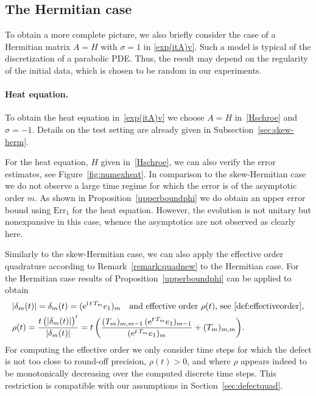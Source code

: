 \documentclass[smallextended]{svjour3pre}%
\numberwithin{equation}{section}
\numberwithin{figure}{section}
\numberwithin{table}{section}
\newcommand{\ttol}{{\rm tol}}
\newcommand\tjnew[1]{{#1}}
\newcommand{\ee}{{\rm e}}
\newcommand{\ii}{{\rm i}}
\newcommand\Erone{\mathrm{Err}_1}
\newcommand\sca{\sigma}
\begin{document}

\subsection{The Hermitian case}\label{sec:numherm}



To obtain a more complete picture, we also briefly consider the case of \tjnew{a Hermitian} matrix $A=H$
with $\sigma=1$ in \eqref{exp(itA)v}.
Such a model is typical of the discretization of a parabolic PDE.
Thus, the result may depend on the regularity of the initial data,
which is chosen to be random in our experiments.

\tjnew{
\paragraph{Heat equation.}
To obtain the heat equation in~\eqref{exp(itA)v} we choose $A=H$ in~\eqref{Hschroe} and $\sca=-1$.
Details on the test setting are already given in Subsection~\ref{sec:skew-herm}.}

For the heat equation, $H$ given in~\eqref{Hschroe}, we can also verify the error estimates, see Figure~\ref{fig:numexheat}.
In comparison to the skew-Hermitian case we do not observe a large time regime for which the error is of the asymptotic order $m$.
As shown in Proposition~\ref{upperboundphi} we do obtain \tjnew{an upper error bound} using $\Erone$ for the heat equation.
However, the evolution is not unitary but nonexpansive in this case, whence the asymptotics are not observed as clearly here.

Similarly to the skew-Hermitian case, we can also apply the effective order quadrature according to Remark~\ref{remark:quadnew} to the Hermitian case.
For the Hermitian case results of Proposition~\ref{upperboundphi} can be applied to obtain
\begin{align*}
&|\delta_m(t)| = \delta_m(t) = (\ee^{\ii\,t\,T_m}e_1)_m~~~\text{and effective order $\rho(t)$, see~\eqref{def:effectiveorder},}\\
&\rho(t)=\frac{t\,\big(|\delta_m(t)|\big)'}{|\delta_m(t)|} =
t\,\bigg( \frac{(T_m)_{m,m-1}\,(\ee^{t\,T_m}e_1)_{m-1}}{(\ee^{t\,T_m}e_1)_m} + (T_m)_{m,m}\bigg).
\end{align*}
For computing the effective order we only consider
time steps for which the defect is not too close to round-off precision,
$\rho(t)>0$, and where $\rho$ appears indeed to be
monotonically decreasing over the computed discrete time steps.
This restriction is compatible with
our assumptions in Section~\ref{sec:defectquad}.
\end{document}
